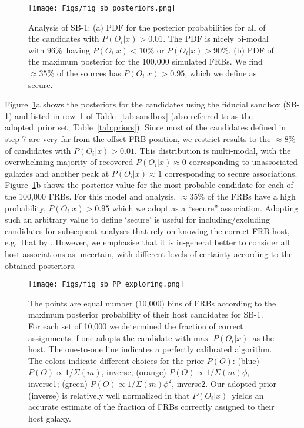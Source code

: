\documentclass[twocolumn,linenumbers]{aastex63}
\newcommand{\mhalflight}{\phi} %
\newcommand{\mPO}{P(O)}  %
\newcommand{\PO}{$\mPO$}
\newcommand{\adopted}{adopted}
\newcommand{\mPOix}{P(O_i|x)}  %
\newcommand{\POix}{$\mPOix$}
\newcommand{\POvsec}{0.95}  %
\newcommand{\simsecure}{35}  %
\begin{document}
\begin{figure}[!ht]
\centering
    \texttt{[image: Figs/fig\_sb\_posteriors.png]}
    \caption{
    Analysis of SB-1:
    (a) PDF for the posterior probabilities for all of the candidates
    with $\mPOix > 0.01$.  The PDF is nicely bi-modal with 
    96\%\ having $\mPOix < 10\%$ or  $\mPOix > 90\%$. 
    (b) PDF of the maximum posterior for the 100,000 simulated FRBs.
    We find $\approx \simsecure \%$ of the sources has 
    $\mPOix > \POvsec$, which we define as secure.
    }
	\label{fig:sb_post}
\end{figure}



Figure~\ref{fig:sb_post}a shows the posteriors for the
candidates using the
fiducial sandbox (SB-1) and
listed in row~1 of Table~\ref{tab:sandbox} 
(also referred to as the \adopted\ prior set;
Table~\ref{tab:priors}).
Since most of the
candidates defined in step 7 are very far
from the offset FRB position, we restrict results
to the $\approx 8\%$ of 
candidates with $\mPOix > 0.01$. 
This distribution is multi-modal, with the overwhelming
majority of recovered $\mPOix \approx 0$ corresponding
to unassociated galaxies and another
peak at $\mPOix \approx 1$ corresponding to secure
associations.
Figure~\ref{fig:sb_post}b shows the posterior
value for the most probable candidate for each of
the 100,000 FRBs.
For this model and analysis, $\approx \simsecure \%$ of
the FRBs have a high probability,
$\mPOix > \POvsec$ which we adopt as a ``secure''
association. Adopting such an arbitrary value
to define `secure' is useful for including/excluding
candidates for subsequent analyses that rely on
knowing the correct FRB host, e.g.\ that by
\citet{Macquart20}. However, we emphasise that
it is in-general better to consider all
host associations as uncertain, with different
levels of certainty according to the obtained
posteriors.

\begin{figure}[!ht]
\centering
    \texttt{[image: Figs/fig\_sb\_PP\_exploring.png]}
    \caption{
    The points are equal number (10,000) bins of FRBs
    according to the maximum posterior probability 
    of their host candidates for SB-1.  
    For each set of 10,000
    we determined the fraction of correct assignments
    if one adopts the candidate with max~\POix\ as the
    host.  The one-to-one line indicates a perfectly
    calibrated algorithm.  
    The colors indicate different choices for the
    prior \PO: 
    (blue) $\mPO \propto 1/\Sigma(m)$, inverse;
    (orange) $\mPO \propto 1/\Sigma(m)\mhalflight$, inverse1;
    (green) $\mPO \propto 1/\Sigma(m)\mhalflight^2$, inverse2.
    Our adopted prior (inverse) is relatively well normalized
    in that \POix\ yields an accurate estimate of the
    fraction of FRBs correctly assigned to their host galaxy.
    }
	\label{fig:sb_priors}
\end{figure}
\end{document}
